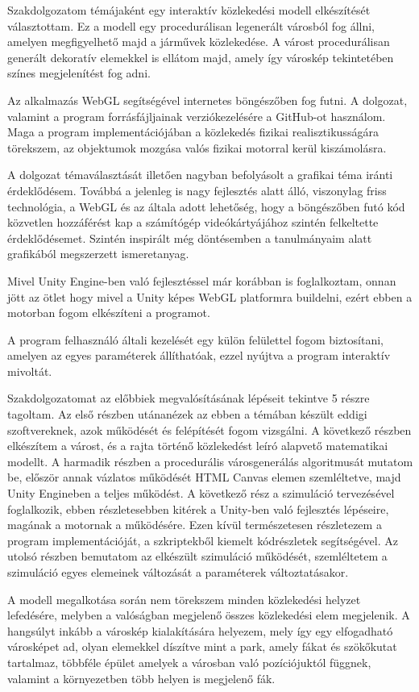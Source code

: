 
Szakdolgozatom témájaként egy interaktív közlekedési modell elkészítését választottam. Ez a modell egy procedurálisan legenerált városból fog állni, amelyen megfigyelhető majd a járművek közlekedése. A várost procedurálisan generált dekoratív elemekkel is ellátom majd, amely így városkép tekintetében színes megjelenítést fog adni. 

Az alkalmazás WebGL segítségével internetes böngészőben fog futni.
A dolgozat, valamint a program forrásfájljainak verziókezelésére a GitHub-ot használom.
Maga a program implementációjában a közlekedés fizikai realisztikusságára törekszem, az objektumok mozgása valós fizikai motorral kerül kiszámolásra.

A dolgozat témaválasztását illetően nagyban befolyásolt a grafikai téma iránti érdeklődésem. Továbbá a jelenleg is nagy fejlesztés alatt álló, viszonylag friss technológia, a WebGL és az általa adott lehetőség, hogy a böngészőben futó kód közvetlen hozzáférést kap a számítógép videókártyájához szintén felkeltette érdeklődésemet. Szintén inspirált még döntésemben a tanulmányaim alatt grafikából megszerzett ismeretanyag.

Mivel Unity Engine-ben való fejlesztéssel már korábban is foglalkoztam, onnan jött az ötlet hogy mivel a Unity képes WebGL platformra buildelni, ezért ebben a motorban fogom elkészíteni a programot.

A program felhasználó általi kezelését egy külön felülettel fogom biztosítani, amelyen az egyes paraméterek állíthatóak, ezzel nyújtva a program interaktív mivoltát.

Szakdolgozatomat az előbbiek megvalósításának lépéseit tekintve 5 részre tagoltam. Az első részben utánanézek az ebben a témában készült eddigi szoftvereknek, azok működését és felépítését fogom vizsgálni. 
A következő részben elkészítem a várost, és a rajta történő közlekedést leíró alapvető matematikai modellt. 
A harmadik részben a procedurális városgenerálás algoritmusát mutatom be, először annak vázlatos működését HTML Canvas elemen szemléltetve, majd Unity Engineben a teljes működést. 
A következő rész a szimuláció tervezésével foglalkozik, ebben részletesebben kitérek a Unity-ben való fejlesztés lépéseire, magának a motornak a működésére. Ezen kívül természetesen részletezem a program implementációját, a szkriptekből kiemelt kódrészletek segítségével.
Az utolsó részben bemutatom az elkészült szimuláció működését, szemléltetem a szimuláció egyes elemeinek változását a paraméterek változtatásakor.

A modell megalkotása során nem törekszem minden közlekedési helyzet lefedésére, melyben a valóságban megjelenő összes közlekedési elem megjelenik. A hangsúlyt inkább a városkép kialakítására helyezem, mely így egy elfogadható városképet ad, olyan elemekkel díszítve mint a park, amely fákat és szökőkutat tartalmaz, többféle épület amelyek a városban való pozíciójuktól függnek, valamint a környezetben több helyen is megjelenő fák.